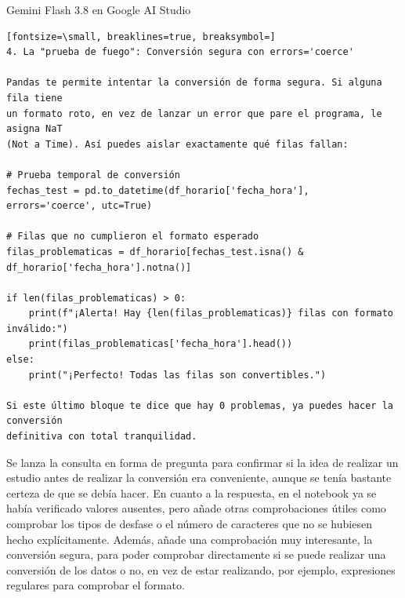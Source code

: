 \documentclass[12pt,a4paper,oneside]{book}
\begin{document}
\begin{iaresp}{Gemini Flash 3.8 en Google AI Studio}
\begin{Verbatim}[fontsize=\small, breaklines=true, breaksymbol=]
4. La "prueba de fuego": Conversión segura con errors='coerce'

Pandas te permite intentar la conversión de forma segura. Si alguna fila tiene
un formato roto, en vez de lanzar un error que pare el programa, le asigna NaT
(Not a Time). Así puedes aislar exactamente qué filas fallan:

# Prueba temporal de conversión
fechas_test = pd.to_datetime(df_horario['fecha_hora'], errors='coerce', utc=True)

# Filas que no cumplieron el formato esperado
filas_problematicas = df_horario[fechas_test.isna() & df_horario['fecha_hora'].notna()]

if len(filas_problematicas) > 0:
    print(f"¡Alerta! Hay {len(filas_problematicas)} filas con formato inválido:")
    print(filas_problematicas['fecha_hora'].head())
else:
    print("¡Perfecto! Todas las filas son convertibles.")

Si este último bloque te dice que hay 0 problemas, ya puedes hacer la conversión
definitiva con total tranquilidad.

\end{Verbatim}
\end{iaresp}
\begin{iaanalisis}
Se lanza la consulta en forma de pregunta para confirmar si la idea de realizar un estudio antes de realizar la conversión era conveniente, aunque se tenía bastante certeza de que se debía hacer. En cuanto a la respuesta, en el notebook ya se había verificado valores ausentes, pero añade otras comprobaciones útiles como comprobar los tipos de desfase o el número de caracteres que no se hubiesen hecho explícitamente. Además, añade una comprobación muy interesante, la conversión segura, para poder comprobar directamente si se puede realizar una conversión de los datos o no, en vez de estar realizando, por ejemplo, expresiones regulares para comprobar el formato.
\end{iaanalisis}
\end{document}

